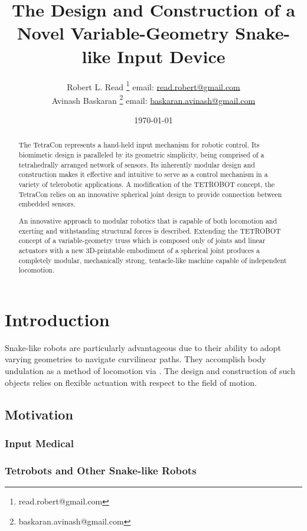 \documentclass[11pt]{article}
\title{The Design and Construction of a Novel Variable-Geometry Snake-like Input Device}
\author{Robert L. Read
  \thanks{read.robert@gmail.com}
  email: \href{mailto:read.robert@gmail.com}{read.robert@gmail.com}\\
Avinash Baskaran
  \thanks{baskaran.avinash@gmail.com}
  email: \href{mailto:Baskaran.avinash@gmail.com}{baskaran.avinash@gmail.com}
  }
\affil{Public Invention, an educational non-profit.}
\date{\today}
\begin{document}
\maketitle


\begin{abstract}

  The TetraCon represents a hand-held input mechanism for robotic control. Its biomimetic design is paralleled by its geometric simplicity, being comprised of a tetrahedrally arranged network of sensors. Its inherently modular design and construction makes it effective and intuitive to serve as a control mechanism in a variety of telerobotic applications. A modification of the TETROBOT\cite{sanderson1996modular,lee2002dynamic,lee1999dynamics,TetrobotBook} concept, the TetraCon relies on an innovative spherical joint design\cite{song2003spherical} to provide connection between embedded sensors.


  An innovative approach to modular robotics that is capable of both locomotion and exerting and
  withstanding structural forces is described.
  Extending the TETROBOT\cite{sanderson1996modular,lee2002dynamic,lee1999dynamics,TetrobotBook}
  concept of a variable-geometry
  truss which is composed only of joints and linear actuators
  with a new 3D-printable embodiment of a
  spherical joint\cite{song2003spherical}
  produces a completely modular, mechanically strong, tentacle-like machine capable of independent locomotion.
\end{abstract}


\section{Introduction}
Snake-like robots are particularly advantageous due to their ability to adopt varying geometries to navigate curvilinear paths.  They accomplish body undulation as a method of locomotion via . The design and construction of such objects relies on flexible actuation with respect to the field of motion.


\subsection{Motivation}

\subsubsection{Input Medical}
\subsubsection{Tetrobots and Other Snake-like Robots}
\end{document}
